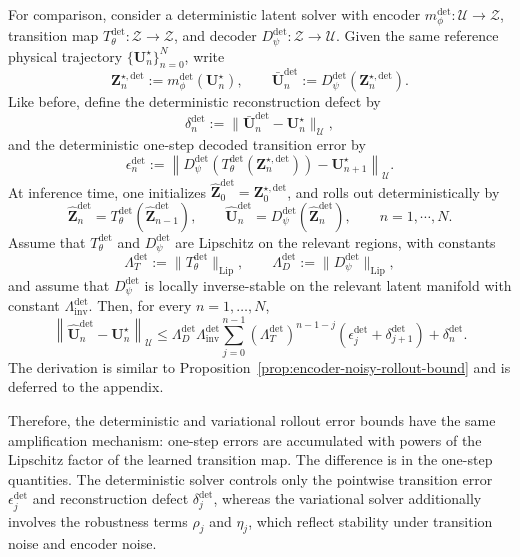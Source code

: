 \documentclass[11pt]{article}
\begin{document}
\begin{remark}
\label{rem:deterministic-rollout-bound}
For comparison, consider a deterministic latent solver with encoder $m_\phi^{\mathrm{det}}:\mathcal U\to\mathcal Z$, transition map $T_\theta^{\mathrm{det}}:\mathcal Z\to\mathcal Z$,
and decoder $D_\psi^{\mathrm{det}}:\mathcal Z\to\mathcal U$. Given the same reference physical trajectory
$\{\mathbf U_n^\star\}_{n=0}^N$, write
\[
    \mathbf Z_n^{\star,\mathrm{det}}:=m_\phi^{\mathrm{det}}(\mathbf U_n^\star),
    \qquad
    \bar{\mathbf U}_n^{\mathrm{det}}
    :=D_\psi^{\mathrm{det}}(\mathbf Z_n^{\star,\mathrm{det}}).
\]
Like before, define the deterministic reconstruction defect by
\[
    \delta_n^{\mathrm{det}}
    :=
    \|\bar{\mathbf U}_n^{\mathrm{det}}-\mathbf U_n^\star\|_{\mathcal U},
\]
and the deterministic one-step decoded transition
error by
\[
    \epsilon_n^{\mathrm{det}}
    :=\left\|D_\psi^{\mathrm{det}}\left(T_\theta^{\mathrm{det}}(\mathbf Z_n^{\star,\mathrm{det}})\right)
    -
    \mathbf U_{n+1}^\star
    \right\|_{\mathcal U}.
\]
At inference time, one initializes $\widehat{\mathbf Z}_0^{\mathrm{det}}
    =
    \mathbf Z_0^{\star,\mathrm{det}}$,
and rolls out deterministically by
\[
    \widehat{\mathbf Z}_{n}^{\mathrm{det}}
    =
    T_\theta^{\mathrm{det}}(\widehat{\mathbf Z}_{n-1}^{\mathrm{det}}),
    \qquad
    \widehat{\mathbf U}_n^{\mathrm{det}}
    =
    D_\psi^{\mathrm{det}}(\widehat{\mathbf Z}_n^{\mathrm{det}}),\qquad n=1,\cdots,N.
\]
Assume that $T_\theta^{\mathrm{det}}$ and $D_\psi^{\mathrm{det}}$ are Lipschitz on the relevant regions, with constants
\[
    \Lambda_T^{\mathrm{det}}
    :=
    \|T_\theta^{\mathrm{det}}\|_{\mathrm{Lip}},
    \qquad
    \Lambda_D^{\mathrm{det}}
    :=
    \|D_\psi^{\mathrm{det}}\|_{\mathrm{Lip}},
\]
and assume that $D_\psi^{\mathrm{det}}$ is locally inverse-stable on the relevant latent manifold with constant $\Lambda_{\mathrm{inv}}^{\mathrm{det}}$. Then, for every $n=1,\ldots,N$,
\begin{equation}
    \left\|
    \widehat{\mathbf U}_n^{\mathrm{det}}
    -\mathbf U_n^\star\right\|_{\mathcal U}
    \le\Lambda_D^{\mathrm{det}}
    \Lambda_{\mathrm{inv}}^{\mathrm{det}}
    \sum_{j=0}^{n-1}
    \left(\Lambda_T^{\mathrm{det}}\right)^{n-1-j}\left(\epsilon_j^{\mathrm{det}}+\delta_{j+1}^{\mathrm{det}}\right)+\delta_n^{\mathrm{det}}.\label{eq:deterministic_rollout_bound}
\end{equation}
The derivation is similar to Proposition~\ref{prop:encoder-noisy-rollout-bound} and is deferred to the appendix.

Therefore, the deterministic and variational rollout error bounds have the same amplification mechanism: one-step errors are accumulated with powers of the Lipschitz factor of the learned transition map. The difference is in the one-step quantities. The deterministic solver controls only the pointwise transition error $\epsilon_j^{\mathrm{det}}$ and reconstruction defect $\delta_j^{\mathrm{det}}$, whereas the variational solver additionally involves the robustness terms $\rho_j$ and $\eta_j$, which reflect stability under transition noise and encoder noise.
\end{remark}
\end{document}

